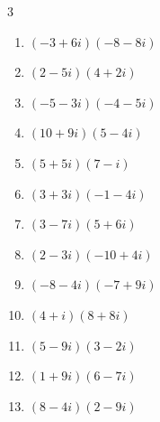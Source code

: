 \begin{multicols}{3}
\begin{enumerate}
  \item $\displaystyle (-3+6i)(-8-8i)$

        \phantom{$\displaystyle =72-24i$}

  \item $\displaystyle (2-5i)(4+2i)$

        \phantom{$\displaystyle =18-16i$}

  \item $\displaystyle (-5-3i)(-4-5i)$

        \phantom{$\displaystyle =5+37i$}

  \item $\displaystyle (10+9i)(5-4i)$

        \phantom{$\displaystyle =86+5i$}

  \item $\displaystyle (5+5i)(7-i)$

        \phantom{$\displaystyle =40+30i$}

  \item $\displaystyle (3+3i)(-1-4i)$

        \phantom{$\displaystyle =9-15i$}

  \item $\displaystyle (3-7i)(5+6i)$

        \phantom{$\displaystyle =57-17i$}

  \item $\displaystyle (2-3i)(-10+4i)$

        \phantom{$\displaystyle =-8+38i$}

  \item $\displaystyle (-8-4i)(-7+9i)$

        \phantom{$\displaystyle =92-44i$}

  \item $\displaystyle (4+i)(8+8i)$

        \phantom{$\displaystyle =24+40i$}

  \item $\displaystyle (5-9i)(3-2i)$

        \phantom{$\displaystyle =-3-37i$}

  \item $\displaystyle (1+9i)(6-7i)$

        \phantom{$\displaystyle =69+47i$}

\columnbreak %

  \item $\displaystyle (8-4i)(2-9i)$

        \phantom{$\displaystyle =-20-80i$}


\end{enumerate}
\end{multicols}
